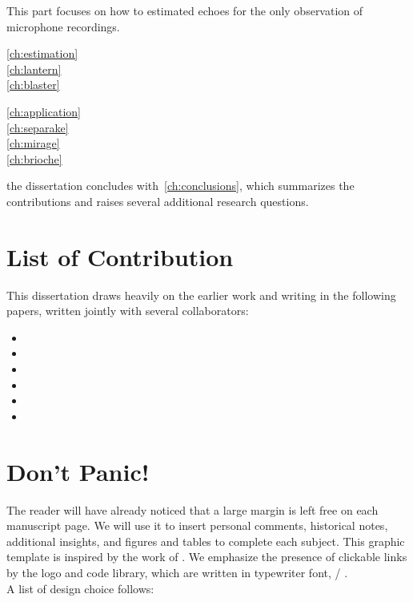 This part focuses on how to estimated echoes for the only observation of microphone recordings.
\begin{description}
    \item[\cref{ch:estimation}]\synopsisChEstimation
    \item[\cref{ch:lantern}]\synopsisChLantern
    \item[\cref{ch:blaster}]\synopsisChBlaster
\end{description}



\begin{description}
\item[\cref{ch:application}]\synopsisChApplication
\item[\cref{ch:separake}]\synopsisChSeparake
\item[\cref{ch:mirage}]\synopsisChMirage
\item[\cref{ch:brioche}]\synopsisChDecharateApp
\end{description}

 the dissertation concludes with~\cref{ch:conclusions}, which summarizes the contributions and raises several additional research questions.


\section{List of Contribution}
This dissertation draws heavily on the earlier work and writing in the following papers, written jointly with several collaborators:

\begin{itemize}
    \item {}
    \item {}
    \item {}
    \item {}
    \item {}
    \item {}
\end{itemize}


\section{Don't Panic!}
The reader will have already noticed that a large margin is left free on each manuscript page.
We will use it to insert personal comments, historical notes, additional insights, and figures and tables to complete each subject.
This graphic template is inspired by the work of \citeauthor{tufte1983visual}
.
We emphasize the presence of clickable links by the \ExternalLink logo and code library, which are written in typewriter font, \eg/ .
\\A list of design choice follows:

